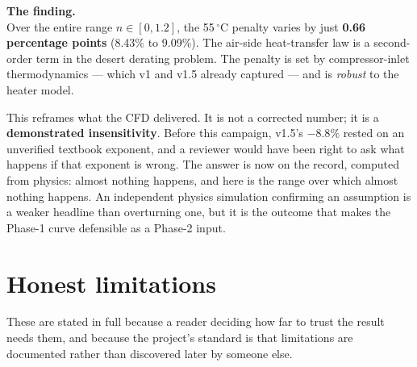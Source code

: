 \documentclass[11pt]{article}
\newcommand{\co}{$^\circ$C}
\newcommand{\keybox}[2]{%
  \begin{center}\colorbox{boxbg}{\begin{minipage}{0.94\linewidth}\vspace{3pt}
  \textbf{#1}\\[2pt]#2\vspace{3pt}\end{minipage}}\end{center}}
\begin{document}
\keybox{The finding.}{Over the entire range $n \in [0,1.2]$, the 55\,\co{} penalty varies by just
\textbf{0.66 percentage points} (8.43\% to 9.09\%). The air-side heat-transfer law is a second-order term in
the desert derating problem. The penalty is set by compressor-inlet thermodynamics --- which v1 and v1.5
already captured --- and is \emph{robust} to the heater model.}

This reframes what the CFD delivered. It is not a corrected number; it is a \textbf{demonstrated
insensitivity}. Before this campaign, v1.5's $-8.8\%$ rested on an unverified textbook exponent, and a
reviewer would have been right to ask what happens if that exponent is wrong. The answer is now on the record,
computed from physics: almost nothing happens, and here is the range over which almost nothing happens. An
independent physics simulation confirming an assumption is a weaker headline than overturning one, but it is
the outcome that makes the Phase-1 curve defensible as a Phase-2 input.


\section{Honest limitations}
\label{sec:limits}

These are stated in full because a reader deciding how far to trust the result needs them, and because the
project's standard is that limitations are documented rather than discovered later by someone else.
\end{document}
